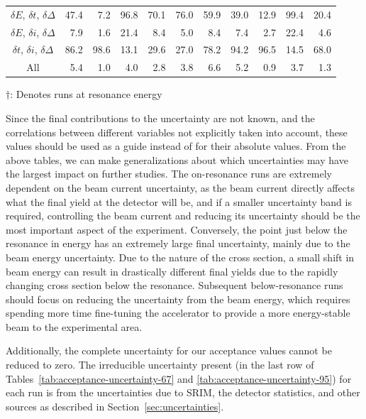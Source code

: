 \begin{table}
\begin{center}
\begin{tabular}{crrrrrrrrrr}
$\delta E$, $\delta t$, $\delta\Delta$ &  47.4 &   7.2 &  96.8 &  70.1 &  76.0 &  59.9 &  39.0 &  12.9 &  99.4 &  20.4 \\
$\delta E$, $\delta i$, $\delta\Delta$ &   7.9 &   1.6 &  21.4 &   8.4 &   5.0 &   8.4 &   7.4 &   2.7 &  22.4 &   4.6 \\
$\delta t$, $\delta i$, $\delta\Delta$ &  86.2 &  98.6 &  13.1 &  29.6 &  27.0 &  78.2 &  94.2 &  96.5 &  14.5 &  68.0 \\
All &   5.4 &   1.0 &   4.0 &   2.8 &   3.8 &   6.6 &   5.2 &   0.9 &   3.7 &   1.3 \\
            \bottomrule
        \end{tabular}

        \vspace{0.5em}
        $\dagger$: Denotes runs at resonance energy
    \end{center}
\end{table}

Since the final contributions to the uncertainty are not known, and the
correlations between different variables not explicitly taken into
account, these values should be used as a guide instead of for their
absolute values. From the above tables, we can make generalizations
about which uncertainties may have the largest impact on further
studies. The on-resonance runs are extremely dependent on the beam
current uncertainty, as the beam current directly affects what the final
yield at the detector will be, and if a smaller uncertainty band is
required, controlling the beam current and reducing its uncertainty
should be the most important aspect of the experiment. Conversely, the
point just below the resonance in energy has an extremely large final
uncertainty, mainly due to the beam energy uncertainty. Due to the
nature of the cross section, a small shift in beam energy can result in
drastically different final yields due to the rapidly changing cross
section below the resonance. Subsequent below-resonance runs should
focus on reducing the uncertainty from the beam energy, which requires
spending more time fine-tuning the accelerator to provide a more
energy-stable beam to the experimental area.

Additionally, the complete uncertainty for our acceptance values cannot
be reduced to zero. The irreducible uncertainty present (in the last row
of Tables~\ref{tab:acceptance-uncertainty-67} and
\ref{tab:acceptance-uncertainty-95}) for each run is from the
uncertainties due to SRIM, the detector statistics, and other sources as
described in Section~\ref{sec:uncertainties}.


